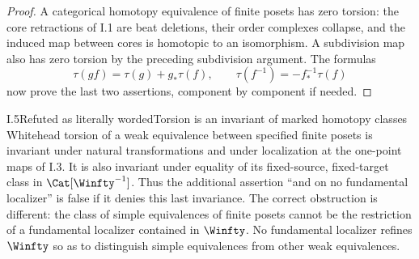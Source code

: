 \begin{proof}
A categorical homotopy equivalence of finite posets has zero torsion:
the core retractions of I.1 are beat deletions, their order complexes
collapse, and the induced map between cores is homotopic to an
isomorphism. A subdivision map also has zero torsion by the preceding
subdivision argument. The formulas
\[
 \tau(gf)=\tau(g)+g_*\tau(f),\qquad
 \tau(f^{-1})=-f_*^{-1}\tau(f)
\]
now prove the last two assertions, component by component if needed.
\end{proof}

\begin{claim}{I.5}{Refuted as literally worded}{Torsion is an invariant of marked homotopy classes}
Whitehead torsion of a weak equivalence between specified finite posets
is invariant under natural transformations and under localization at
the one-point maps of I.3. It is also invariant under equality of its
fixed-source, fixed-target class in $\Cat[\Winfty^{-1}]$.
Thus the additional assertion ``and on no fundamental localizer'' is
false if it denies this last invariance. The correct obstruction is
different: the class of simple equivalences of finite posets cannot be
the restriction of a fundamental localizer contained in $\Winfty$.
No fundamental localizer refines $\Winfty$ so as to distinguish simple
equivalences from other weak equivalences.
\end{claim}

